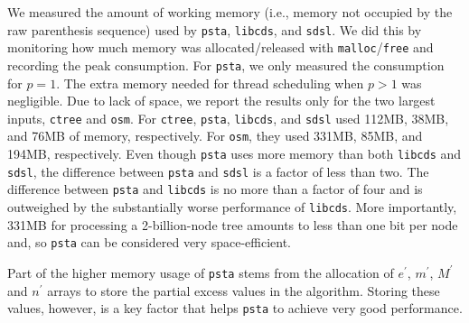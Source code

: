 We measured the amount of working memory (i.e., memory not occupied by the raw
parenthesis sequence) used by {\tt psta}, {\tt libcds}, and {\tt sdsl}.
We did this by monitoring how much memory was allocated/released with
\texttt{malloc}/\texttt{free} and recording the peak consumption.
For {\tt psta}, we only measured the consumption for $p = 1$.
The extra memory needed for thread scheduling when $p > 1$ was negligible.
Due to lack of space, we report the results only for the two largest inputs,
{\tt ctree} and {\tt osm}.
For {\tt ctree}, {\tt psta}, {\tt libcds}, and {\tt sdsl} used 112MB, 38MB, and
76MB of memory, respectively.
For {\tt osm}, they used 331MB, 85MB, and 194MB, respectively.
Even though {\tt psta} uses more memory than both {\tt libcds} and {\tt sdsl},
the difference between {\tt psta} and {\tt sdsl} is a factor of less than two.
The difference between {\tt psta} and {\tt libcds} is no more than a factor of
four and is outweighed by the substantially worse performance of {\tt libcds}.
More importantly, 331MB for processing a 2-billion-node tree amounts to less
than one bit per node and, so {\tt psta} can be considered very space-efficient.

Part of the higher memory usage of {\tt psta} stems from the allocation of
$e^{\prime}$, $m^{\prime}$, $M^{\prime}$ and $n^{\prime}$ arrays to store the
partial excess values in the algorithm.
Storing these values, however, is a key factor that helps {\tt psta} to achieve
very good performance.
